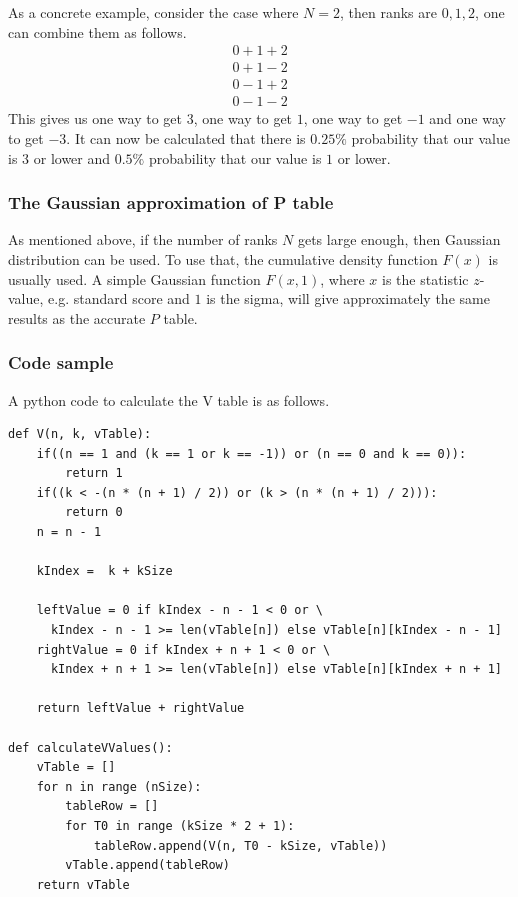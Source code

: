 \documentclass[12pt]{article}
\begin{document}
{As a concrete example, consider the case where $N=2$, then ranks are ${0, 1, 2}$, one can combine them as follows.
\begin{align*}
0 + 1 + 2 \\
0 + 1 - 2\\
0 - 1 + 2\\
0 - 1 - 2
\end{align*}
This gives us one way to get $3$, one way to get $1$, one way to get $-1$ and one way to get $-3$. It can now be calculated that there is $0.25\%$ probability that our value is $3$ or lower and $0.5\%$ probability that our value is $1$ or lower.

\subsubsection{The Gaussian approximation of P table}
As mentioned above, if the number of ranks $N$ gets large enough, then Gaussian distribution can be used. To use that, the cumulative density function $F(x)$ is usually used. A simple Gaussian function $F(x, 1)$, where $x$ is the statistic $z$-value, e.g. standard score and $1$ is the sigma, will give approximately the same results as the accurate $P$ table.

\subsubsection{Code sample}
A python code to calculate the V table is as follows.
\begin{verbatim}
def V(n, k, vTable):
    if((n == 1 and (k == 1 or k == -1)) or (n == 0 and k == 0)):
        return 1
    if((k < -(n * (n + 1) / 2)) or (k > (n * (n + 1) / 2))):
        return 0
    n = n - 1

    kIndex =  k + kSize

    leftValue = 0 if kIndex - n - 1 < 0 or \
      kIndex - n - 1 >= len(vTable[n]) else vTable[n][kIndex - n - 1]
    rightValue = 0 if kIndex + n + 1 < 0 or \
      kIndex + n + 1 >= len(vTable[n]) else vTable[n][kIndex + n + 1]

    return leftValue + rightValue

def calculateVValues():
    vTable = []
    for n in range (nSize):
        tableRow = []
        for T0 in range (kSize * 2 + 1):
            tableRow.append(V(n, T0 - kSize, vTable))
        vTable.append(tableRow)
    return vTable

\end{verbatim}

}
\end{document}
